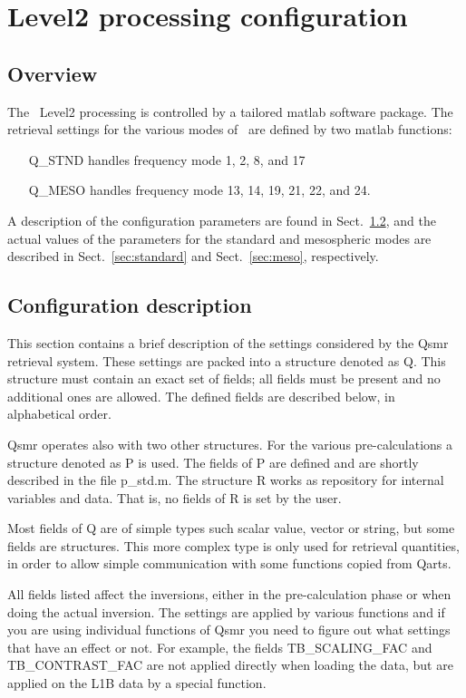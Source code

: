\chapter{Level2 processing configuration}

\section{Overview}
The \smr\ Level2 processing is controlled by a tailored matlab software
package. The retrieval settings for the various modes of \smr\
are defined by two matlab functions:
 
\begin{itemize}
\item[{Q\_STND}]
  handles frequency mode 1, 2, 8, and 17
\item[{Q\_MESO}]
  handles frequency mode 13, 14, 19, 21, 22, and 24.
\end{itemize}

A description of the configuration parameters are found
in Sect.~\ref{sec:config}, and the actual values
of the parameters for the standard and mesospheric modes
are described in Sect.~\ref{sec:standard} and Sect.~\ref{sec:meso},
respectively.

\section{Configuration description}
\label{sec:config}

This section contains a brief description of the settings considered by the
Qsmr retrieval system. These settings are packed into a structure denoted
as Q. This structure must contain an exact set of fields; all fields must be
present and no additional ones are allowed. The defined fields are described
below, in alphabetical order.

Qsmr operates also with two other structures. For the various
pre-calculations a structure denoted as P is used. The fields of P are
defined and are shortly described in the file p\_std.m. The structure R works
as repository for internal variables and data. That is, no fields of R is
set by the user.

Most fields of Q are of simple types such scalar value, vector or string,
but some fields are structures. This more complex type is only used for
retrieval quantities, in order to allow simple communication with some
functions copied from Qarts.

All fields listed affect the inversions, either in the pre-calculation phase
or when doing the actual inversion. The settings are applied by various
functions and if you are using individual functions of Qsmr you need to
figure out what settings that have an effect or not. For example, the fields
TB\_SCALING\_FAC and TB\_CONTRAST\_FAC are not applied directly when loading the
data, but are applied on the L1B data by a special function.

